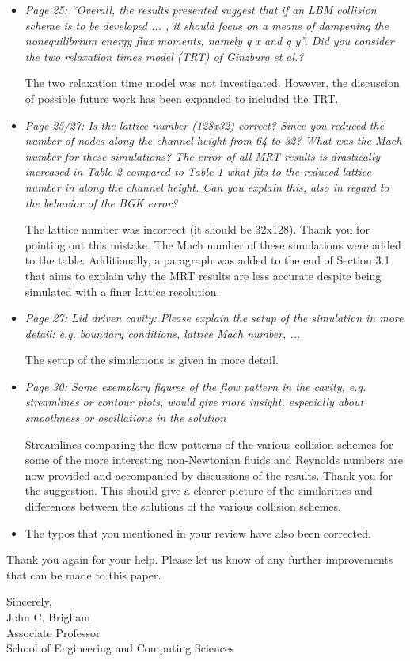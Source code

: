 \documentclass{article}
\begin{document}
\begin{itemize}
	\item \emph{Page 25: ``Overall, the results presented suggest that if an LBM collision scheme is to
		be developed ... , it should focus on a means of dampening the nonequilibrium
		energy flux moments, namely q x and q y''. Did you consider the two relaxation times
		model (TRT) of Ginzburg et al.?}
	
	The two relaxation time model was not investigated. However, the discussion of possible future work has been expanded to included the TRT.
	
	\item \emph{Page 25/27: Is the lattice number (128x32) correct? Since you reduced the number
		of nodes along the channel height from 64 to 32? What was the Mach number for
		these simulations? The error of all MRT results is drastically increased in Table 2
		compared to Table 1 what fits to the reduced lattice number in along the channel
		height. Can you explain this, also in regard to the behavior of the BGK error?}
	
	The lattice number was incorrect (it should be 32x128).
	Thank you for pointing out this mistake.
	The Mach number of these simulations were added to the table.
	Additionally, a paragraph was added to the end of Section 3.1 that aims to explain why the MRT results are less accurate despite being simulated with a finer lattice resolution.
	
	\item \emph{Page 27: Lid driven cavity: Please explain the setup of the simulation in more detail:
		e.g. boundary conditions, lattice Mach number, ...}
	
	The setup of the simulations is given in more detail.
	
	\item \emph{Page 30: Some exemplary figures of the flow pattern in the cavity, e.g. streamlines or
		contour plots, would give more insight, especially about smoothness or oscillations in
		the solution}
	
	Streamlines comparing the flow patterns of the various collision schemes for some of the more interesting non-Newtonian fluids and Reynolds numbers are now provided and accompanied by discussions of the results.
	Thank you for the suggestion.
	This should give a clearer picture of the similarities and differences between the solutions of the various collision schemes.
	
	\item The typos that you mentioned in your review have also been corrected.
	
	\end{itemize}

Thank you again for your help. Please let us know of any further improvements that can be made to this paper.

\vspace{1in}
\noindent Sincerely, \\
\indent John C. Brigham \vspace{0.1in}\\
\indent Associate Professor \\
\indent School of Engineering and Computing Sciences
	
\end{document}
